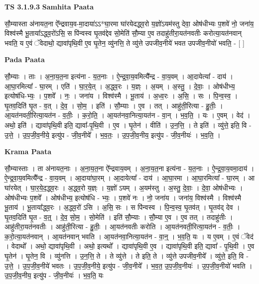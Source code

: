 \documentclass[17pt]{extarticle}
\begin{document}
\textbf{TS 3.1.9.3 } \newline
\textbf{Samhita Paata} \newline

सौ॒म्यास्ता अ॑नायत॒ना ऐ᳚न्द्रवाय॒व-मा॒दाया॑ऽऽ*घा॒रमा घा॑रयेदद्ध्व॒रो य॒ज्ञो॑ऽयम॑स्तु देवा॒ ओष॑धीभ्यः प॒शवे॑ नो॒ जना॑य॒ विश्व॑स्मै भू॒ताया᳚ऽद्ध्व॒रो॑ऽसि॒ स पि॑न्वस्व घृ॒तव॑द्देव सो॒मेति॑ सौ॒म्या ए॒व तदाहु॑तीरा॒यत॑नवतीः करोत्या॒यत॑नवान् भवति॒ य ए॒वं ॅवेदाथो॒ द्यावा॑पृथि॒वी ए॒व घृ॒तेन॒ व्यु॑नत्ति॒ ते व्यु॑त्ते उपजीव॒नीये॑ भवत उपजीव॒नीयो॑ भवति॒ - [  ] \newline

\textbf{Pada Paata} \newline

सौ॒म्याः । ताः । अ॒ना॒य॒त॒ना इत्य॑ना - य॒त॒नाः । ऐ॒न्द्र॒वा॒य॒वमित्यै᳚न्द्र - वा॒य॒वम् । आ॒दायेत्या᳚ - दाय॑ । आ॒घा॒रमित्या᳚ - घा॒रम् । एति॑ । घा॒र॒ये॒त् । अ॒द्ध्व॒रः । य॒ज्ञ्ः । अ॒यम् । अ॒स्तु॒ । दे॒वाः॒ । ओष॑धीभ्य॒ इत्योष॑धि-भ्यः॒ । प॒शवे᳚ । नः॒ । जना॑य । विश्व॑स्मै । भू॒ताय॑ । अ॒ध्व॒रः । अ॒सि॒ । सः । पि॒न्व॒स्व॒ । घृ॒तव॒दिति॑ घृ॒त - व॒त् । दे॒व॒ । सो॒म॒ । इति॑ । सौ॒म्याः । ए॒व । तत् । आहु॑ती॒रित्या - हु॒तीः॒ । आ॒यत॑नवती॒रित्या॒यत॑न - व॒तीः॒ । क॒रो॒ति॒ । आ॒यत॑नवा॒नित्या॒यत॑न - वा॒न् । भ॒व॒ति॒ । यः । ए॒वम् । वेद॑ । अथो॒ इति॑ । द्यावा॑पृथि॒वी इति॒ द्यावा᳚-पृ॒थि॒वी । ए॒व । घृ॒तेन॑ । वीति॑ । उ॒न॒त्ति॒ । ते इति॑ । व्यु॑त्ते॒ इति॒ वि - उ॒त्ते॒ । उ॒प॒जी॒व॒नीये॒ इत्यु॑प - जी॒व॒नीये᳚ । भ॒व॒तः॒ । उ॒प॒जी॒व॒नीय॒ इत्यु॑प - जी॒व॒नीयः॑ । भ॒व॒ति॒ ।  \newline


\textbf{Krama Paata} \newline

सौ॒म्यास्ताः । ता अ॑नायत॒नाः । अ॒ना॒य॒त॒ना ऐ᳚न्द्रवाय॒वम् । अ॒ना॒य॒त॒ना इत्य॑ना - य॒त॒नाः । ऐ॒न्द्र॒वा॒य॒वमा॒दाय॑ । ऐ॒न्द्र॒वा॒य॒वमित्यै᳚न्द्र - वा॒य॒वम् । आ॒दाया॑घा॒रम् । आ॒दायेत्या᳚ - दाय॑ । आ॒घा॒रमा । आ॒घा॒रमित्या᳚ - घा॒रम् । आ घा॑रयेत् । घा॒र॒ये॒द॒द्ध्व॒रः । अ॒द्ध्व॒रो य॒ज्ञ्ः । य॒ज्ञो॑ ऽयम् । अ॒यम॑स्तु । अ॒स्तु॒ दे॒वाः॒ । दे॒वा॒ ओष॑धीभ्यः । ओष॑धीभ्यः प॒शवे᳚ । ओष॑धीभ्य॒ इत्योष॑धि - भ्यः॒ । प॒शवे॑ नः । नो॒ जना॑य । जना॑य॒ विश्व॑स्मै । विश्व॑स्मै भू॒ताय॑ । भू॒ताया᳚द्ध्व॒रः । अ॒द्ध्व॒रो॑ ऽसि । अ॒सि॒ सः । स पि॑न्वस्व । पि॒न्व॒स्व॒ घृ॒तव॑त् । घृ॒तव॑द् देव । घृ॒तव॒दिति॑ घृ॒त - व॒त्॒ । दे॒व॒ सो॒म॒ । सो॒मेति॑ । इति॑ सौ॒म्याः । सौ॒म्या ए॒व । ए॒व तत् । तदाहु॑तीः । आहु॑तीरा॒यत॑नवतीः । आहु॑ती॒रित्या - हु॒तीः॒ । आ॒यत॑नवतीः करोति । आ॒यत॑नवती॒रित्या॒यत॑न - व॒तीः॒ । क॒रो॒त्या॒यत॑नवान् । आ॒यत॑नवान् भवति । आ॒यत॑नवा॒नित्या॒यत॑न - वा॒न्॒ । भ॒व॒ति॒ यः । य ए॒वम् । ए॒वं ॅवेद॑ । वेदाथो᳚ । अथो॒ द्यावा॑पृथि॒वी । अथो॒ इत्यथो᳚ । द्यावा॑पृथि॒वी ए॒व । द्यावा॑पृथि॒वी इति॒ द्यावा᳚ - पृ॒थि॒वी । ए॒व घृ॒तेन॑ । घृ॒तेन॒ वि । व्यु॑नत्ति । उ॒न॒त्ति॒ ते । ते व्यु॑त्ते । ते इति॒ ते । व्यु॑त्ते उपजीव॒नीये᳚ । व्यु॑त्ते॒ इति॒ वि - उ॒त्ते॒ । उ॒प॒जी॒व॒नीये॑ भवतः । उ॒प॒जी॒व॒नीये॒ इत्यु॑प - जी॒व॒नीये᳚ । भ॒व॒त॒ उ॒प॒जी॒व॒नीयः॑ । उ॒प॒जी॒व॒नीयो॑ भवति । उ॒प॒जी॒व॒नीय॒ इत्यु॑प - जी॒व॒नीयः॑ । भ॒व॒ति॒ यः \newline
\end{document}
